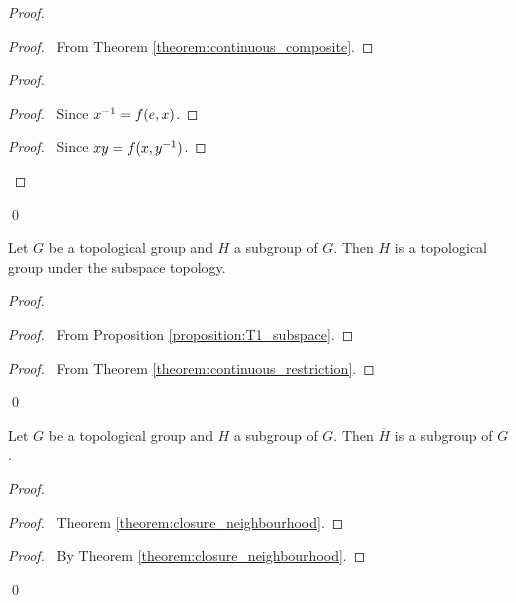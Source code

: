 \begin{proof}
    \pf
    \begin{proof}
        \pf\ From Theorem \ref{theorem:continuous_composite}.
    \end{proof}
    \begin{proof}
        \begin{proof}
            \pf\ Since ${x}^{-1} = f(e,x)$.
        \end{proof}
        \begin{proof}
            \pf\ Since $xy = f(x,{y}^{-1})$.
        \end{proof}
    \end{proof}
    \qed
\end{proof}

\begin{lemma}
    Let $G$ be a topological group and $H$ a subgroup of $G$. Then $H$ is a topological group
    under the subspace topology.
\end{lemma}

\begin{proof}
    \pf
    \begin{proof}
        \pf\ From Proposition \ref{proposition:T1_subspace}.
    \end{proof}
    \begin{proof}
        \pf\ From Theorem \ref{theorem:continuous_restriction}.
    \end{proof}
    \qed
\end{proof}

\begin{lemma}
    Let $G$ be a topological group and $H$ a subgroup of $G$. Then 
    $\overline{H}$ is a subgroup of $G$.
\end{lemma}

\begin{proof}
    \pf
    \begin{proof}
        \pf\ Theorem \ref{theorem:closure_neighbourhood}.
    \end{proof}
    \qedstep
    \begin{proof}
        \pf\ By Theorem \ref{theorem:closure_neighbourhood}.
    \end{proof}
    \qed
\end{proof}

